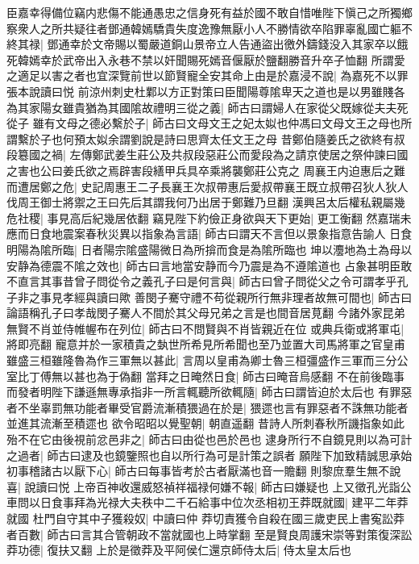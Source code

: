 臣嘉幸得備位竊内悲傷不能通愚忠之信身死有益於國不敢自惜唯陛下愼己之所獨鄉察衆人之所共疑往者鄧通韓嫣驕貴失度逸豫無厭小人不勝情欲卒陷罪辜亂國亡軀不終其禄|{
	鄧通幸於文帝賜以蜀嚴道銅山景帝立人告通盜出徼外鑄錢没入其家卒以餓死韓嫣幸於武帝出入永巷不禁以奸聞賜死嫣音偃厭於鹽翻勝音升卒子恤翻}
所謂愛之適足以害之者也宜深覽前世以節賢寵全安其命上由是於嘉浸不說|{
	為嘉死不以罪張本說讀曰悦}
前涼州刺史杜鄴以方正對策曰臣聞陽尊隂卑天之道也是以男雖賤各為其家陽女雖貴猶為其國隂故禮明三從之義|{
	師古曰謂婦人在家從父既嫁從夫夫死從子}
雖有文母之德必繫於子|{
	師古曰文母文王之妃太姒也仲馮曰文母文王之母也所謂繫於子也何預太姒余謂劉說是詩曰思齊太任文王之母}
昔鄭伯隨姜氏之欲終有叔段簒國之禍|{
	左傳鄭武姜生莊公及共叔段惡莊公而愛段為之請京使居之祭仲諫曰國之害也公曰姜氏欲之焉辟害段繕甲兵具卒乘將襲鄭莊公克之}
周襄王内迫惠后之難而遭居鄭之危|{
	史記周惠王二子長襄王次叔帶惠后愛叔帶襄王既立叔帶召狄人狄人伐周王御士將禦之王曰先后其謂我何乃出居于鄭難乃旦翻}
漢興呂太后權私親屬幾危社稷|{
	事見高后紀幾居依翻}
竊見陛下約儉正身欲與天下更始|{
	更工衡翻}
然嘉瑞未應而日食地震案春秋災異以指象為言語|{
	師古曰謂天不言但以景象指意告諭人}
日食明陽為隂所臨|{
	日者陽宗隂盛陽微日為所揜而食是為隂所臨也}
坤以灋地為土為母以安静為德震不隂之效也|{
	師古曰言地當安静而今乃震是為不遵隂道也}
占象甚明臣敢不直言其事昔曾子問從令之義孔子曰是何言與|{
	師古曰曾子問從父之令可謂孝乎孔子非之事見孝經與讀曰歟}
善閔子騫守禮不苟從親所行無非理者故無可間也|{
	師古曰論語稱孔子曰孝哉閔子騫人不間於其父母兄弟之言是也間音居莧翻}
今諸外家昆弟無賢不肖並侍帷幄布在列位|{
	師古曰不問賢與不肖皆親近在位}
或典兵衛或將軍屯|{
	將即亮翻}
寵意并於一家積貴之埶世所希見所希聞也至乃並置大司馬將軍之官皇甫雖盛三桓雖隆魯為作三軍無以甚此|{
	言周以皇甫為卿士魯三桓彊盛作三軍而三分公室比丁傅無以甚也為于偽翻}
當拜之日晻然日食|{
	師古曰晻音烏感翻}
不在前後臨事而發者明陛下謙遜無專承指非一所言輒聽所欲輒隨|{
	師古曰謂皆迫於太后也}
有罪惡者不坐辜罰無功能者畢受官爵流漸積猥過在於是|{
	猥遝也言有罪惡者不誅無功能者並進其流漸至積遝也}
欲令昭昭以覺聖朝|{
	朝直遥翻}
昔詩人所刺春秋所譏指象如此殆不在它由後視前忿邑非之|{
	師古曰由從也邑於邑也}
逮身所行不自鏡見則以為可計之過者|{
	師古曰逮及也鏡鑒照也自以所行為可是計策之誤者}
願陛下加致精誠思承始初事稽諸古以厭下心|{
	師古曰每事皆考於古者厭滿也音一贍翻}
則黎庶羣生無不說喜|{
	說讀曰悦}
上帝百神收還威怒禎祥福禄何嫌不報|{
	師古曰嫌疑也}
上又徵孔光詣公車問以日食事拜為光禄大夫秩中二千石給事中位次丞相初王莽既就國|{
	建平二年莽就國}
杜門自守其中子獲殺奴|{
	中讀曰仲}
莽切責獲令自殺在國三歲吏民上書寃訟莽者百數|{
	師古曰言其合管朝政不當就國也上時掌翻}
至是賢良周護宋崇等對策復深訟莽功德|{
	復扶又翻}
上於是徵莽及平阿侯仁還京師侍太后|{
	侍太皇太后也}
